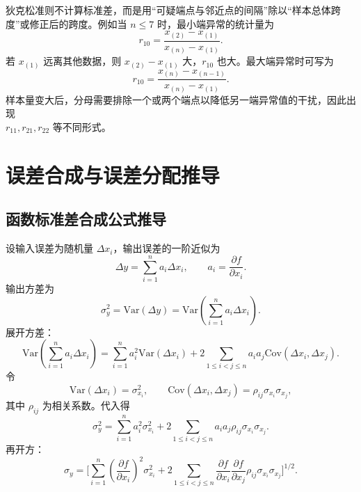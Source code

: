 \documentclass[UTF8,12pt,a4paper]{ctexart}
\newcommand{\Var}{\mathrm{Var}}
\newcommand{\Cov}{\mathrm{Cov}}
\begin{document}
狄克松准则不计算标准差，而是用“可疑端点与邻近点的间隔”除以“样本总体跨度”或修正后的跨度。例如当 $n\le 7$ 时，最小端异常的统计量为
\begin{equation*}
    r_{10}=\frac{x_{(2)}-x_{(1)}}{x_{(n)}-x_{(1)}} .
\end{equation*}
若 $x_{(1)}$ 远离其他数据，则 $x_{(2)}-x_{(1)}$ 大，$r_{10}$ 也大。最大端异常时可写为
\begin{equation*}
    r_{10}=\frac{x_{(n)}-x_{(n-1)}}{x_{(n)}-x_{(1)}} .
\end{equation*}
样本量变大后，分母需要排除一个或两个端点以降低另一端异常值的干扰，因此出现 \\$r_{11},r_{21},r_{22}$ 等不同形式。

\section{误差合成与误差分配推导}

\subsection{函数标准差合成公式推导}
设输入误差为随机量 $\Delta x_i$，输出误差的一阶近似为
\begin{equation*}
    \Delta y=\sum_{i=1}^{n}a_i\Delta x_i,
    \qquad
    a_i=\frac{\partial f}{\partial x_i} .
\end{equation*}
输出方差为
\begin{equation*}
    \sigma_y^2=\Var(\Delta y)=\Var\left(\sum_{i=1}^{n}a_i\Delta x_i\right) .
\end{equation*}
展开方差：
\begin{equation*}
    \Var\left(\sum_{i=1}^{n}a_i\Delta x_i\right)
    =\sum_{i=1}^{n}a_i^2\Var(\Delta x_i)
    +2\sum_{1\le i<j\le n}a_i a_j\Cov(\Delta x_i,\Delta x_j) .
\end{equation*}
令
\begin{equation*}
    \Var(\Delta x_i)=\sigma_{x_i}^2,
    \qquad
    \Cov(\Delta x_i,\Delta x_j)=\rho_{ij}\sigma_{x_i}\sigma_{x_j},
\end{equation*}
其中 $\rho_{ij}$ 为相关系数。代入得
\begin{equation*}
    \sigma_y^2
    =\sum_{i=1}^{n}a_i^2\sigma_{x_i}^2
    +2\sum_{1\le i<j\le n}a_i a_j\rho_{ij}\sigma_{x_i}\sigma_{x_j} .
\end{equation*}
再开方：
\begin{equation*}
    \sigma_y=\bigg[
    \sum_{i=1}^{n}\left(\frac{\partial f}{\partial x_i}\right)^2\sigma_{x_i}^2
    +2\sum_{1\le i<j\le n}
    \frac{\partial f}{\partial x_i}\frac{\partial f}{\partial x_j}
    \rho_{ij}\sigma_{x_i}\sigma_{x_j}
    \bigg]^{1/2} .
\end{equation*}
\end{document}
